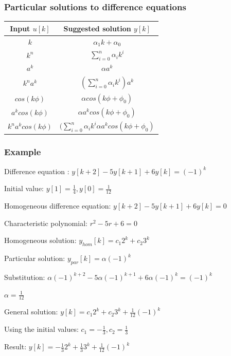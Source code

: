 \begin{frame}
	\frametitle{Particular solutions to difference equations}
	\begin{tabular}{|c|c|}
		\hline Input $u[k]$ & Suggested solution $y[k]$  \\ 
		\hline $k$ & $\alpha_1k+\alpha_0 $\\ 
		\hline $k^{n}$ & $\sum\limits_{i=0}^{n}\alpha_{i}k^{i}$ \\ 
		\hline $a^{k}$&  $\alpha a^{k}$\\ 
		\hline $k^{n}a^{k}$ & $(\sum\limits_{i=0}^{n}\alpha_{i}k^{i})a^{k}$  \\ 
		\hline $cos(k\phi)$ & $\alpha cos(k\phi + \phi_0)$\\ 
		\hline $a^{k}cos(k\phi)$ & $\alpha a^{k} cos(k\phi + \phi_0)$  \\ 
		\hline  $k^{n}a^{k}cos(k\phi)$&  $(\sum\limits_{i=0}^{n}\alpha_{i}k^{i}\alpha a^{k} cos(k\phi + \phi_0)$ \\ 
		\hline 
	\end{tabular} 
\end{frame}
\begin{frame}
	\frametitle{Example}
	\begin{example}
		\begin{itemize}
			\setlength\itemsep{0em}
			\small{
			\item Difference equation : $y[k+2] - 5y[k+1]+6y[k]=(-1)^k$
			\item Initial value:  $y[1] = \frac{1}{4}, y[0] = \frac{1}{12}$
			\item Homogeneous difference equation: $y[k+2] - 5y[k+1]+6y[k] = 0$
			\item Characteristic polynomial: $r^2-5r+6 = 0$
			\item Homogeneous solution: $y_{hom}[k] = c_{1}2^{k} + c_{2}3^{k}$
			\item Particular solution: $y_{par}[k] = \alpha(-1)^k$
			\item Substitution: $\alpha(-1)^{k+2}-5\alpha(-1)^{k+1}+6\alpha(-1)^k = (-1)^k$
			\item $\alpha = \frac{1}{12}$
			\item General solution: $y[k] = c_{1}2^{k}+c_{2}3^{k}+\frac{1}{12}(-1)^{k}$
			\item Using the initial values: $c_1 = -\frac{1}{3}, c_{2} = \frac{1}{3}$
			\item Result:  $y[k]= -\frac{1}{3}2^{k}+\frac{1}{3}3^{k}+\frac{1}{12}(-1)^{k}$}
		\end{itemize}
	\end{example}

\end{frame}
